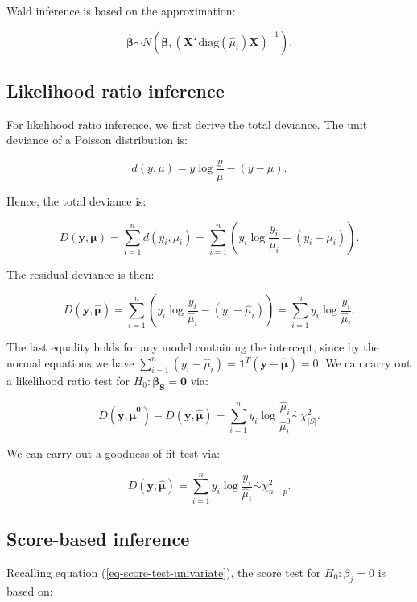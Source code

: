 \documentclass[
  11pt,
  letterpaper,
  oneside]{book}
\theoremstyle{plain}
\theoremstyle{plain}
\theoremstyle{definition}
\theoremstyle{definition}
\theoremstyle{plain}
\theoremstyle{remark}
\begin{document}
Wald inference is based on the approximation:

\[
\boldsymbol{\hat \beta} \overset \cdot \sim N(\boldsymbol{\beta}, (\boldsymbol{X}^T \text{diag}(\hat \mu_i)\boldsymbol{X})^{-1}).
\]

\hypertarget{sec-likelihood-ratio-inference}{%
\subsection{Likelihood ratio
inference}\label{sec-likelihood-ratio-inference}}

For likelihood ratio inference, we first derive the total deviance. The
unit deviance of a Poisson distribution is:

\[
d(y, \mu) = y \log \frac{y}{\mu} - (y - \mu).
\]

Hence, the total deviance is:

\[
D(\boldsymbol{y}, \boldsymbol{\mu}) = \sum_{i = 1}^n d(y_i, \mu_i) = \sum_{i = 1}^n \left(y_i \log \frac{y_i}{\mu_i} - (y_i - \mu_i)\right).
\]

The residual deviance is then:

\[
D(\boldsymbol{y}, \boldsymbol{\hat\mu}) = \sum_{i = 1}^n \left(y_i \log \frac{y_i}{\hat \mu_i} - (y_i - \hat \mu_i)\right) = \sum_{i = 1}^n y_i \log \frac{y_i}{\hat \mu_i}.
\]

The last equality holds for any model containing the intercept, since by
the normal equations we have
\(\sum_{i = 1}^n (y_i - \hat \mu_i) = \boldsymbol{1}^T (\boldsymbol{y} - \boldsymbol{\hat \mu}) = 0\).
We can carry out a likelihood ratio test for
\(H_0: \boldsymbol{\beta_S} = \boldsymbol{0}\) via:

\[
D(\boldsymbol{y}, \boldsymbol{\hat \mu^0}) - D(\boldsymbol{y}, \boldsymbol{\hat \mu}) = \sum_{i = 1}^n y_i \log \frac{\hat \mu_i}{\hat \mu^0_{i}} \overset{\cdot}\sim \chi^2_{|S|}.
\]

We can carry out a goodness-of-fit test via:

\[
D(\boldsymbol{y}, \boldsymbol{\hat\mu}) = \sum_{i = 1}^n y_i \log \frac{y_i}{\hat \mu_i} \overset{\cdot}\sim \chi^2_{n - p}.
\]

\hypertarget{sec-score-based-inference}{%
\subsection{Score-based inference}\label{sec-score-based-inference}}

Recalling equation (\ref{eq-score-test-univariate}), the score test for
\(H_0: \beta_j = 0\) is based on:
\end{document}
